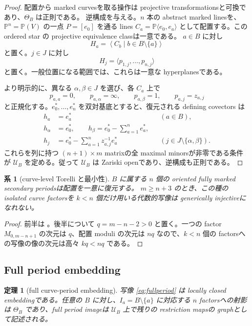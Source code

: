 \documentclass[11pt,a4paper]{ltjsarticle}
\newcommand{\PP}{\mathbb P}
\newcommand{\cU}{\mathcal U}
\theoremstyle{plain}
\newtheorem{theorem}{定理}[section]
\newtheorem{corollary}[corollary]{系}
\theoremstyle{definition}
\theoremstyle{remark}
\begin{document}
\begin{proof}
配置から marked curvesを取る操作は projective transformationsと可換であり、$\Theta_B$ は正則である。
逆構成を与える。$n$ 本の abstract marked linesを、$\PP^n=\PP(V)$ の一点 $P=[e_0]$ を通る lines
$C_a=\PP\langle e_0,e_a\rangle$ として配置する。この ordered star の projective equivalence classは一意である。
$a\in B$ に対し
\[
 H_a=\left\langle C_b\mid b\in B\setminus\{a\}\right\rangle
\]
と置く。$j\in J$ に対し
\begin{equation}
\label{eq:span-Hj}
 H_j=\langle p_{1,j},\ldots,p_{n,j}\rangle
\end{equation}
と置く。一般位置になる範囲では、これらは一意な hyperplanesである。

より明示的に、異なる $\alpha,\beta\in J$ を選び、各 $C_a$ 上で
\[
 p_{a,a}=0,
 \qquad p_{a,\alpha}=\infty,
 \qquad p_{a,\beta}=1,
 \qquad p_{a,j}=z_{a,j}
\]
と正規化する。$e_0^*,\ldots,e_n^*$ を双対基底とすると、復元される defining covectors は
\begin{align}
 h_a&=e_a^* &&(a\in B),\label{eq:star-ha}\\
 h_\alpha&=e_0^*,\qquad
 h_\beta=e_0^*-\sum_{a=1}^ne_a^*,\label{eq:star-hab}\\
 h_j&=e_0^*-\sum_{a=1}^nz_{a,j}^{-1}e_a^*
 &&(j\in J\setminus\{\alpha,\beta\}).\label{eq:star-hj}
\end{align}
これらを列に持つ $(n+1)\times m$ matrixの全 maximal minorsが非零である条件が $\cU_B$ を定める。従って $\cU_B$ は Zariski openであり、逆構成も正則である。
\end{proof}

\begin{corollary}[curve-level Torelli と最小性]
\label{cor:minimal-torelli}
$B$ に属する $n$ 個の oriented fully marked secondary periodsは配置を一意に復元する。
$m\ge n+3$ のとき、この種の isolated curve factorsを $k<n$ 個だけ用いる代数的写像は generically injectiveになれない。
\end{corollary}

\begin{proof}
前半は 。後半について $q=m-n-2>0$ と置く。一つの factor $M_{0,m-n+1}$ の次元は $q$、配置 moduli の次元は $nq$ なので、$k<n$ 個の factorsへの写像の像の次元は高々 $kq<nq$ である。
\end{proof}

\subsection{Full period embedding}
\begin{theorem}[full curve-period embedding]
\label{thm:period-embedding}
写像 \eqref{eq:fullperiod} は locally closed embeddingである。任意の $B$ に対し、$I_a=B\setminus\{a\}$ に対応する $n$ factorsへの射影は $\Theta_B$ であり、full period imageは $\cU_B$ 上で残りの restriction mapsの graphとして記述される。
\end{theorem}
\end{document}
